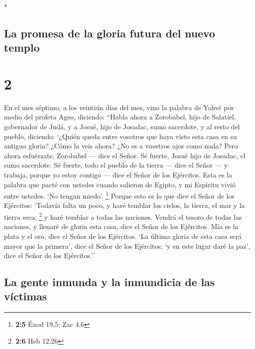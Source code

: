 \begin{paracol}{2}
\begin{otherlanguage}{english}
\end{otherlanguage}

\switchcolumn[0]*

\hypertarget{la-promesa-de-la-gloria-futura-del-nuevo-templo}{%
\subsection{La promesa de la gloria futura del nuevo
templo}\label{la-promesa-de-la-gloria-futura-del-nuevo-templo}}

\hypertarget{section-2}{%
\section{2}\label{section-2}}

 En el mes séptimo, a los veintiún días del mes, vino la
palabra de Yahvé por medio del profeta Ageo, diciendo: 
``Habla ahora a Zorobabel, hijo de Salatiel, gobernador de Judá, y a
Josué, hijo de Josadac, sumo sacerdote, y al resto del pueblo, diciendo:
 `¿Quién queda entre vosotros que haya visto esta casa en
su antigua gloria? ¿Cómo la veis ahora? ¿No es a vuestros ojos como
nada?  Pero ahora esfuérzate, Zorobabel --- dice el Señor.
Sé fuerte, Josué hijo de Josadac, el sumo sacerdote. Sé fuerte, todo el
pueblo de la tierra --- dice el Señor --- y trabaja, porque yo estoy
contigo --- dice el Señor de los Ejércitos.  Esta es la
palabra que pacté con ustedes cuando salieron de Egipto, y mi Espíritu
vivió entre ustedes. `No tengan miedo'. \footnote{\textbf{2:5} Éxod
  19,5; Zac 4,6}  Porque esto es lo que dice el Señor de
los Ejércitos: `Todavía falta un poco, y haré temblar los cielos, la
tierra, el mar y la tierra seca; \footnote{\textbf{2:6} Heb 12,26}
 y haré temblar a todas las naciones. Vendrá el tesoro de
todas las naciones, y llenaré de gloria esta casa, dice el Señor de los
Ejércitos.  Mía es la plata y el oro, dice el Señor de los
Ejércitos.  `La última gloria de esta casa será mayor que
la primera', dice el Señor de los Ejércitos; `y en este lugar daré la
paz', dice el Señor de los Ejércitos.''

\hypertarget{la-gente-inmunda-y-la-inmundicia-de-las-vuxedctimas}{%
\subsection{La gente inmunda y la inmundicia de las
víctimas}\label{la-gente-inmunda-y-la-inmundicia-de-las-vuxedctimas}}


\end{paracol}
